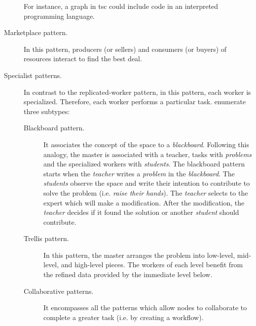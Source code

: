 \begin{description}
\begin{enumerate*}[label=\itshape(\arabic*\upshape)]
			  \end{enumerate*}
			  For instance, a graph in \ac{tsc} could include code in an interpreted programming language.
  \item[Marketplace pattern.] In this pattern, producers (or sellers) and consumers (or buyers) of resources interact to find the best deal. %
  \item[Specialist patterns.] In contrast to the replicated-worker pattern, in this pattern, each worker is specialized.
                              Therefore, each worker performs a particular task.
                              \citeauthor{freeman_javaspaces_1999} enumerate three subtypes:
			      \begin{description}
				  \item[Blackboard pattern.]
					It associates the concept of the space to a \emph{blackboard}.
					Following this analogy, the master is associated with a teacher, tasks with \emph{problems} and the specialized workers with \emph{students}.
					The blackboard pattern starts when the \emph{teacher} writes a \emph{problem} in the \emph{blackboard}.
					The \emph{students} observe the space and write their intention to contribute to solve the problem (i.e. \emph{raise their hands}).
					The \emph{teacher} selects to the expert which will make a modification.
					After the modification, the \emph{teacher} decides if it found the solution or another \emph{student} should contribute.
				  \item [Trellis pattern.]
					In this pattern, the master arranges the problem into low-level, mid-level, and high-level pieces.
					The workers of each level benefit from the refined data provided by the immediate level below.
				  \item [Collaborative patterns.]
					It encompasses all the patterns which allow nodes to collaborate to complete a greater task (i.e. by creating a workflow).
			      \end{description}
\end{description}


